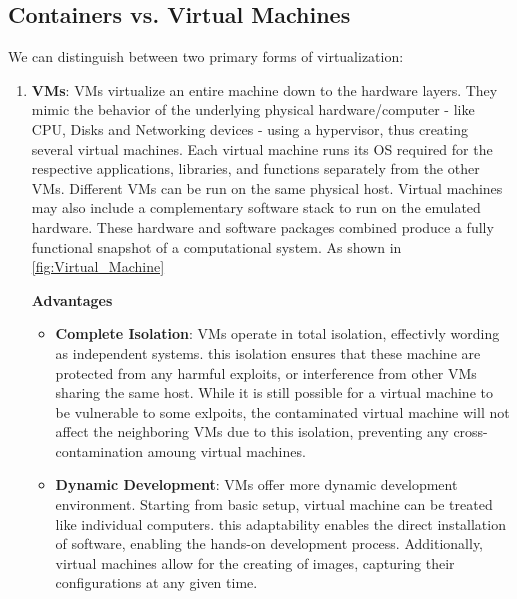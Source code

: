 \subsection{Containers vs. Virtual Machines}
We can distinguish between two primary forms of virtualization:
\begin{enumerate}
    \item \textbf{\ac{VMs}}: \ac{VMs} virtualize an entire machine down to the hardware layers. They mimic the behavior of the underlying physical hardware/computer - like CPU, Disks and Networking devices - using a hypervisor, thus creating several virtual machines. Each virtual machine runs its \ac{OS} required for the respective applications, libraries, and functions separately from the other \ac{VMs}. Different \ac{VMs} can be run on the same physical host. Virtual machines may also include a complementary software stack to run on the emulated hardware. These hardware and software packages combined produce a fully functional snapshot of a computational system. As shown in \autoref{fig:Virtual_Machine}
          
          \newline
          \textbf{Advantages}
          \begin{itemize}
              \item \textbf{Complete Isolation}: \ac{VMs} operate in total isolation, effectivly wording as independent systems. this isolation ensures that these machine are protected from any harmful exploits, or interference from other \ac{VMs} sharing the same host. While it is still possible for a virtual machine to be vulnerable to some exlpoits, the contaminated virtual machine will not affect the neighboring \ac{VMs} due to this isolation, preventing any cross-contamination amoung virtual machines.
              \item \textbf{Dynamic Development}: \ac{VMs} offer more dynamic development environment. Starting from basic setup, virtual machine can be treated like individual computers. this adaptability enables the direct installation of software, enabling the hands-on development process. Additionally, virtual machines allow for the creating of images, capturing their configurations at any given time.
          \end{itemize}


\end{enumerate}
